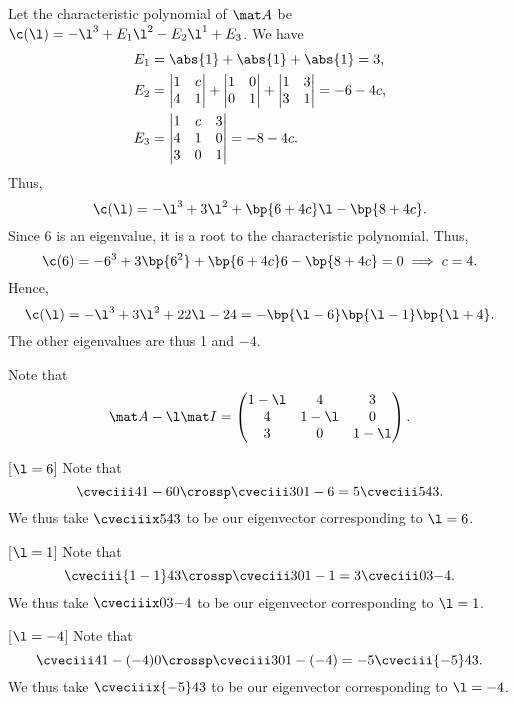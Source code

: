 \begin{solution}
    \begin{ppart}
        Let the characteristic polynomial of $\mat A$ be $\c(\l) = -\l^3 + E_1 \l^2 - E_2 \l^1 + E_3$. We have
        \begin{align*}
            E_1 &= \abs{1} + \abs{1} + \abs{1} = 3,\\
            E_2 &= \begin{vmatrix}1 & c \\ 4 & 1 \end{vmatrix} + \begin{vmatrix}1 & 0 \\ 0 & 1\end{vmatrix} + \begin{vmatrix}1 & 3 \\ 3 & 1\end{vmatrix} = -6 - 4c,\\
            E_3 &= \begin{vmatrix}1 & c & 3 \\ 4 & 1 & 0 \\ 3 & 0 & 1\end{vmatrix} = -8-4c.
        \end{align*}
        Thus, \[\c(\l) = -\l^3 + 3\l^2 + \bp{6 + 4c} \l - \bp{8 + 4c}.\] Since 6 is an eigenvalue, it is a root to the characteristic polynomial. Thus, \[\c(6) = -6^3 + 3 \bp{6^2} + \bp{6 + 4c}6 - \bp{8 + 4c} = 0 \implies c = 4.\] Hence, \[\c(\l) = -\l^3 + 3\l^2 + 22\l - 24 = -\bp{\l-6}\bp{\l-1}\bp{\l+4}.\] The other eigenvalues are thus 1 and $-4$.
    \end{ppart}
    \begin{ppart}
        Note that \[\mat A - \l \mat I = \begin{pmatrix}1 - \l & 4 & 3 \\ 4 & 1 - \l & 0 \\ 3 & 0 & 1 - \l\end{pmatrix}.\]
        
        [$\l = 6$] Note that \[\cveciii4{1-6}0 \crossp \cveciii30{1-6} = 5\cveciii543.\] We thus take $\cveciiix543$ to be our eigenvector corresponding to $\l = 6$.

        [$\l = 1$] Note that \[\cveciii{1-1}43 \crossp \cveciii30{1-1} = 3\cveciii03{-4}.\] We thus take $\cveciiix03{-4}$ to be our eigenvector corresponding to $\l = 1$.

        [$\l = -4$] Note that \[\cveciii4{1-(-4)}0 \crossp \cveciii30{1-(-4)} = -5\cveciii{-5}43.\] We thus take $\cveciiix{-5}43$ to be our eigenvector corresponding to $\l = -4$.


\end{ppart}
\end{solution}
